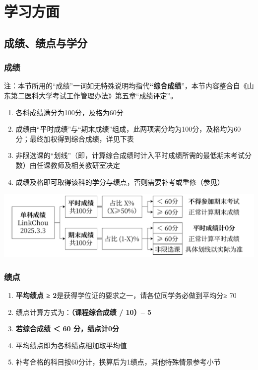\chapter[学习方面]{学习方面}

\section[成绩、绩点与学分]{成绩、绩点与学分}

\subsection[成绩]{成绩}
注：本节所用的“成绩”一词如无特殊说明均指代\textbf{“综合成绩}”，本节内容整合自《山东第二医科大学考试工作管理办法》第五章“成绩评定”。
\begin{enumerate}
    \item 各科成绩满分为100分，及格为60分
    \item 成绩由“平时成绩”与“期末成绩”组成，此两项满分均为100分，及格均为60分；最终加权得到综合成绩，详见下表
    \item 非限选课的“划线”（即，计算综合成绩时计入平时成绩所需的最低期末考试分数）由任课教师及相关教研室决定
    \item 成绩及格即可取得该科的学分与绩点，否则需要补考或重修（参见）
\end{enumerate}

\begin{table}[H]
    \centering
    \includegraphics[width=\textwidth]{resources/sundry/单科成绩计算.pdf}
    \label{score}
\end{table}

\subsection[绩点]{绩点}
\label{gpa} %
\begin{enumerate}
    \item \textbf{平均绩点 ≥ 2}是获得学位证的要求之一，请各位同学务必做到平均分≥ 70
    \item 绩点计算方式为：\textbf{（课程综合成绩 / 10）-- 5}
    \item \textbf{若综合成绩 ＜ 60 分，绩点计0分}
    \item 平均绩点即为各科绩点相加取平均值
    \item 补考合格的科目按60分计，换算后为1绩点，其他特殊情景参考小节
\end{enumerate}

